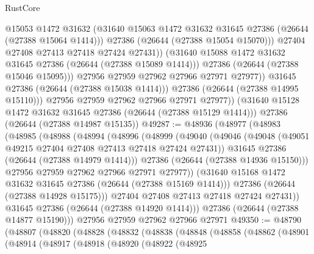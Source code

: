\begin{lexlean}{RustCore}
\begin{coremodule}
                        @15053
                        @1472
                        @31632
                        (@31640 @15063 @1472 @31632 @31645 @27386 (@26644 (@27388 @15064 @1414)))
                        @27386
                        (@26644 (@27388 @15054 @15070)))
                      @27404
                      @27408
                      @27413
                      @27418
                      @27424
                      @27431))
                  (@31640 @15088 @1472 @31632 @31645 @27386 (@26644 (@27388 @15089 @1414)))
                  @27386
                  (@26644 (@27388 @15046 @15095)))
                @27956
                @27959
                @27962
                @27966
                @27971
                @27977))
            @31645
            @27386
            (@26644 (@27388 @15038 @1414)))
          @27386
          (@26644 (@27388 @14995 @15110)))
        @27956
        @27959
        @27962
        @27966
        @27971
        @27977))
    (@31640 @15128 @1472 @31632 @31645 @27386 (@26644 (@27388 @15129 @1414)))
    @27386
    (@26644 (@27388 @14987 @15135))
@49287 := @48936
    (@48977
      (@48983
        (@48985
          (@48988
            (@48994
              (@48996
                (@48999
                  (@49040
                    (@49046
                      (@49048 (@49051 @49215 @27404 @27408 @27413 @27418 @27424 @27431))
                      @31645
                      @27386
                      (@26644 (@27388 @14979 @1414)))
                    @27386
                    (@26644 (@27388 @14936 @15150)))
                  @27956
                  @27959
                  @27962
                  @27966
                  @27971
                  @27977))
              (@31640 @15168 @1472 @31632 @31645 @27386 (@26644 (@27388 @15169 @1414)))
              @27386
              (@26644 (@27388 @14928 @15175)))
            @27404
            @27408
            @27413
            @27418
            @27424
            @27431))
        @31645
        @27386
        (@26644 (@27388 @14920 @1414)))
      @27386
      (@26644 (@27388 @14877 @15190)))
    @27956
    @27959
    @27962
    @27966
    @27971
@49350 := @48790
    (@48807
      (@48820
        (@48828
          (@48832
            (@48838
              (@48848
                (@48858
                  (@48862
                    (@48901
                      (@48914
                        (@48917
                          (@48918
                            (@48920
                              (@48922
                                (@48925

\end{coremodule}
\end{lexlean}
